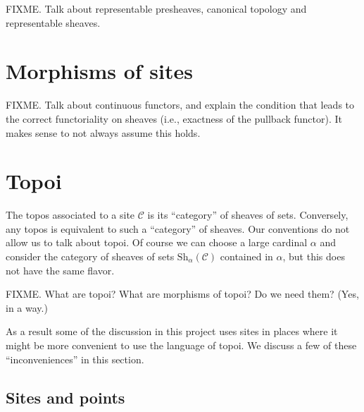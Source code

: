 \noindent
FIXME. Talk about representable presheaves, canonical topology and
representable sheaves.

\section{Morphisms of sites}
\label{section-morphism-sites}

\noindent
FIXME. Talk about continuous functors, and explain the condition that leads to
the correct functoriality on sheaves (i.e., exactness of the pullback functor).
It makes sense to not always assume this holds.

\section{Topoi}

\noindent
The topos associated to a site $\mathcal{C}$ is its ``category'' of sheaves of
sets. Conversely, any topos is equivalent to such a ``category'' of sheaves.
Our conventions do not allow us to talk about topoi. Of course we can choose a
large cardinal $\alpha$ and consider the category of sheaves of sets
$\text{Sh}_\alpha(\mathcal{C})$ contained in $\alpha$, but this does not have
the same flavor.

\smallskip\noindent
FIXME. What are topoi? What are morphisms of topoi? Do we need them? (Yes, in a
way.)

\smallskip\noindent
As a result some of the discussion in this project uses sites in places where
it might be more convenient to use the language of topoi. We discuss a few
of these ``inconveniences'' in this section.

\subsection{Sites and points}
\label{subsection-points}


